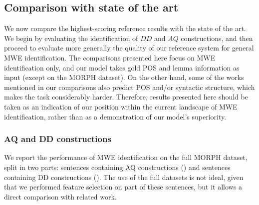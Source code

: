\documentclass[output=paper,modfonts]{langscibook}
\begin{document}
\begin{comment}
FTB-test & 84.03 & 74.71 & 79.10 & 86.72 & 78.47 & 82.39 \\ \hline
\end{tabular}
\caption{Second features selection on FTB-dev with all MWEs}
\label{tab:ftbAllMWEsFine}
\end{table*}

The first important remark is that the results do not vary as much as the case of nominal MWEs, which is logical since the AMs are measures applied on nominal MWEs only. But we remark a similar behaviour that in tests on nominal MWEs. Moreover, the only tests that increase the results are when we remove the dice measure, and when we remove the t measure. Our BEST configuration will be the configuration without the t measure, since when we tried to remove dice and t in the same time, the results decrease. 

Then, we applied the features group BEST to FTB-test, and we obtain a MWE-based F$_1$ score of 79.10\%, and a Token-based score of 82.39\%. 
\end{comment}



\subsection{Comparison with state of the art}
\label{subsec:compare}

We now compare the highest-scoring reference results with the state of the art. We begin by evaluating the identification of $DD$ and $AQ$ constructions, and then proceed to evaluate more generally the quality of our reference system for general MWE identification. The comparisons presented here focus on MWE identification only, and our model takes gold POS and lemma information as input (except on the MORPH dataset). On the other hand, some of the works mentioned in our comparisons also predict POS and/or syntactic structure, which makes the task considerably harder. Therefore, results presented here should be taken as an indication of our position within the current landscape of MWE identification, rather than as a demonstration of our model's superiority.


\subsubsection{AQ and DD constructions}

We report the performance of MWE identification on the full MORPH dataset, split in two parts: sentences containing AQ constructions (\fullAQ) and sentences containing DD constructions (\fullDD). The use of the full datasets is not ideal, given that we performed feature selection on part of these sentences, but it allows a direct comparison with related work. 
\end{document}

